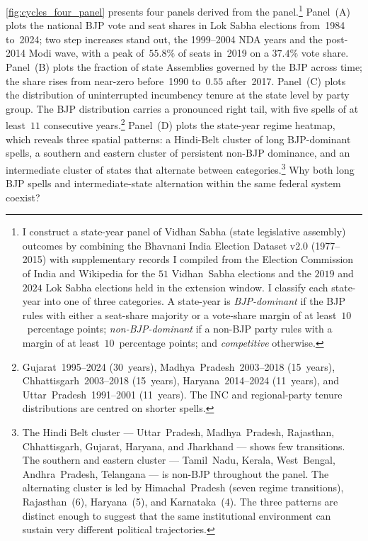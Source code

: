 \autoref{fig:cycles_four_panel} presents four panels derived from the panel.\footnote{I construct a state-year panel of Vidhan Sabha (state legislative assembly)
outcomes by combining the Bhavnani India Election Dataset v2.0
(1977--2015) with supplementary records I compiled from the Election
Commission of India and Wikipedia for the $51$ Vidhan~Sabha elections and
the $2019$ and $2024$ Lok Sabha elections held in the
extension window. I classify each state-year into one of three categories. A state-year
is \emph{BJP-dominant} if the BJP rules with either a seat-share majority
or a vote-share margin of at least~$10$~percentage points;
\emph{non-BJP-dominant} if a non-BJP party rules with a margin of at
least~$10$~percentage points; and \emph{competitive} otherwise.} 
Panel~(A) plots the national BJP vote and seat shares in Lok Sabha elections
from~1984 to~2024; two step increases stand out, the 1999--2004 NDA years
and the post-2014 Modi wave, with a peak of~$55.8\%$ of seats in~2019 on a
$37.4\%$ vote share. Panel~(B) plots the fraction of state Assemblies
governed by the BJP across time; the share rises from near-zero before~1990
to~$0.55$ after~2017. Panel~(C) plots the distribution of uninterrupted
incumbency tenure at the state level by party group. The BJP distribution
carries a pronounced right tail, with five spells of at least~$11$
consecutive years.\footnote{Gujarat~1995--2024 (30~years),
Madhya~Pradesh~2003--2018 (15~years), Chhattisgarh~2003--2018 (15~years),
Haryana~2014--2024 (11~years), and Uttar~Pradesh~1991--2001 (11~years). The
INC and regional-party tenure distributions are centred on shorter spells.}
Panel~(D) plots the state-year regime heatmap, which reveals three spatial
patterns: a Hindi-Belt cluster of long BJP-dominant spells, a southern and
eastern cluster of persistent non-BJP dominance, and an intermediate
cluster of states that alternate between categories.\footnote{The Hindi
Belt cluster --- Uttar~Pradesh, Madhya~Pradesh, Rajasthan, Chhattisgarh,
Gujarat, Haryana, and Jharkhand --- shows few transitions. The southern and
eastern cluster --- Tamil~Nadu, Kerala, West~Bengal, Andhra~Pradesh,
Telangana --- is non-BJP throughout the panel. The alternating cluster is
led by Himachal~Pradesh (seven regime transitions), Rajasthan~(6),
Haryana~(5), and Karnataka~(4). The three patterns are distinct enough to
suggest that the same institutional environment can sustain very different
political trajectories.} Why both long BJP spells and intermediate-state alternation within
the same federal system coexist? 

